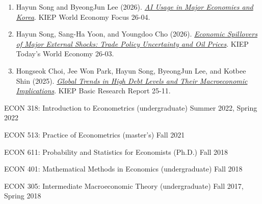\begin{enumerate}[itemsep=0.25em]
\begin{enumerate}[itemsep=0.32em]
  \item Hayun Song and ByeongJun Lee (2026). \href{https://www.kiep.go.kr/gallery.es?act=view\&bid=0004\&list_no=12214\&mid=a10102030000}{\emph{AI Usage in Major Economies and Korea}}. KIEP World Economy Focus 26-04.
  \item Hayun Song, Sang-Ha Yoon, and Youngdoo Cho (2026). \href{https://www.kiep.go.kr/gallery.es?act=view\&bid=0003\&list_no=12190\&mid=a10102020000}{\emph{Economic Spillovers of Major External Shocks: Trade Policy Uncertainty and Oil Prices}}. KIEP Today's World Economy 26-03.
  \item Hongseok Choi, Jee Won Park, Hayun Song, ByeongJun Lee, and Kotbee Shin (2025). \href{https://www.kiep.go.kr/gallery.es?act=view\&bid=0001\&list_no=12300\&mid=a10101200000}{\emph{Global Trends in High Debt Levels and Their Macroeconomic Implications}}. KIEP Basic Research Report 25-11.
\end{enumerate}
\fi

\iflongcv
{}
\else
{}
\fi

\iflongcv
{}
{\small
\hspace*{1.8em}ECON 318: Introduction to Econometrics (undergraduate) \hfill Summer 2022, Spring 2022\par
\hspace*{1.8em}ECON 513: Practice of Econometrics (master's) \hfill Fall 2021\par
\hspace*{1.8em}ECON 611: Probability and Statistics for Economists (Ph.D.) \hfill Fall 2018\par
\hspace*{1.8em}ECON 401: Mathematical Methods in Economics (undergraduate) \hfill Fall 2018\par
\hspace*{1.8em}ECON 305: Intermediate Macroeconomic Theory (undergraduate) \hfill Fall 2017, Spring 2018\par
}


\end{enumerate}
